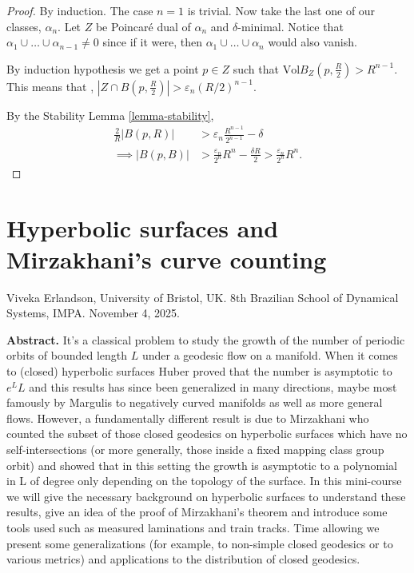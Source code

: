 \begin{proof}
By induction. The case $n=1$ is trivial.
Now take the last one of our classes,
$\alpha_n$.
Let $Z$ be Poincaré dual of $\alpha_n$ and
$\delta$-minimal.
Notice that $\alpha_1\cup \ldots \cup
\alpha_{n-1}\neq 0$
since if it were, then $\alpha_1\cup
\ldots\cup \alpha_n$ would also vanish.

By induction hypothesis we get a point $p \in
Z$
such that $\text{Vol} B_Z(p,\frac{R}{2}) >
R^{n-1}$.
This means that , $|Z \cap
B(p,\frac{R}{2})|>\varepsilon_n(R/2)^{n-1}$.

By the Stability Lemma \ref{lemma-stability},
$$
\begin{aligned}
\frac{2}{R}|B(p,R)|&>\varepsilon_n\frac{R^{n-
1}}{2^{n-1}}-\delta\\
\implies
|B(p,B)|&>\frac{\varepsilon_n}{2^n}R^n-
\frac{\delta
R}{2}
> \frac{\varepsilon_n}{2^n}R^n.
\end{aligned}
$$
\end{proof}

\section{Hyperbolic surfaces and Mirzakhani's
curve counting}
\label{section-hyper-surfa-mizak-curve}

\noindent
Viveka Erlandson, University of Bristol, UK.
8th Brazilian School of Dynamical Systems,
IMPA.
November 4, 2025.

\medskip\noindent
{\bf Abstract.}
It’s a classical problem to study the growth
of the number of periodic orbits of
bounded length $L$ under a geodesic flow on a
manifold. When it comes to
(closed) hyperbolic surfaces Huber proved
that the number is asymptotic to $e^L
L$ and this results has since been
generalized in many directions, maybe most
famously by Margulis to negatively curved
manifolds as well as more general
flows. However, a fundamentally different
result is due to Mirzakhani who
counted the subset of those closed geodesics
on hyperbolic surfaces which have
no self-intersections (or more generally,
those inside a fixed mapping class
group orbit) and showed that in this setting
the growth is asymptotic to a
polynomial in L of degree only depending on
the topology of the surface. In this
mini-course we will give the necessary
background on hyperbolic surfaces to
understand these results, give an idea of the
proof of Mirzakhani’s theorem and
introduce some tools used such as measured
laminations and train tracks. Time
allowing we present some generalizations (for
example, to non-simple closed
geodesics or to various metrics) and
applications to the distribution of closed
geodesics.

